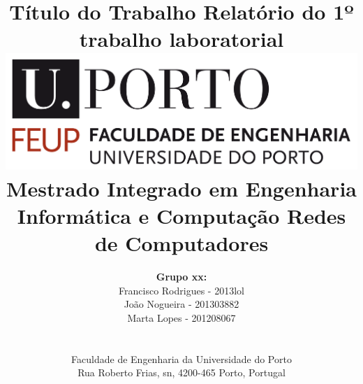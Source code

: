 \documentclass[11pt]{article}
\begin{document}
\setlength{\textwidth}{16cm}
\setlength{\textheight}{22cm}

\title{\Huge\textbf{Título do Trabalho}\linebreak\linebreak\linebreak
\Large\textbf{Relatório do 1º trabalho laboratorial}\linebreak\linebreak
\linebreak\linebreak
\includegraphics[scale=0.1]{feup-logo.png}\linebreak\linebreak
\linebreak\linebreak
\Large{Mestrado Integrado em Engenharia Informática e Computação} \linebreak\linebreak
\Large{Redes de Computadores}\linebreak
}

\author{\textbf{Grupo xx:}\\
Francisco Rodrigues - 2013lol\\
João Nogueira - 201303882 \\
Marta Lopes - 201208067 \\
\linebreak\linebreak \\
 \\ Faculdade de Engenharia da Universidade do Porto \\ Rua Roberto Frias, s\/n, 4200-465 Porto, Portugal \linebreak\linebreak\linebreak
\linebreak\linebreak\vspace{1cm}}

\maketitle
\thispagestyle{empty}
\end{document}
